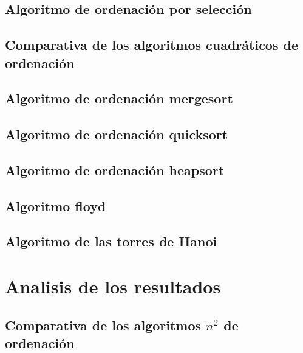 \documentclass{article}
\begin{document}


\subsection{Algoritmo de ordenación por selección}



\subsection{Comparativa de los algoritmos cuadráticos de ordenación}

\subsection{Algoritmo de ordenación mergesort}

\subsection{Algoritmo de ordenación quicksort}

\subsection{Algoritmo de ordenación heapsort}

\subsection{Algoritmo floyd}

\subsection{Algoritmo de las torres de Hanoi}


\section{Analisis de los resultados}

\subsection{Comparativa de los algoritmos $n^2$ de ordenación}
\end{document}
